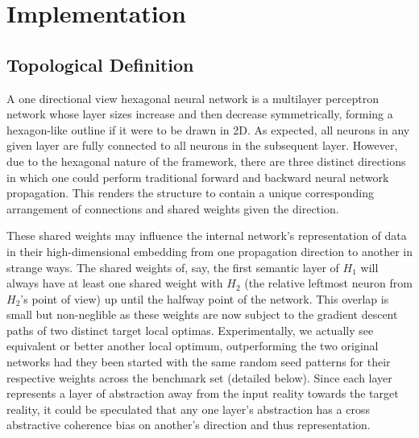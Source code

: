 \section{Implementation}


\subsection{Topological Definition}
A one directional view hexagonal neural network is a multilayer perceptron network whose layer sizes increase and then decrease symmetrically, forming a hexagon-like outline if it were to be drawn in 2D.
As expected, all neurons in any given layer are fully connected to all neurons in the subsequent layer.
However, due to the hexagonal nature of the framework, there are three distinct directions in which one could perform traditional forward and backward neural network propagation.
This renders the structure to contain a unique corresponding arrangement of connections and shared weights given the direction.


These shared weights may influence the internal network's representation of data in their high-dimensional embedding from one propagation direction to another in strange ways.
The shared weights of, say, the first semantic layer of $H_1$ will always have at least one shared weight with $H_2$ (the relative leftmost neuron from $H_2$'s point of view) up until the halfway point of the network.
This overlap is small but non-neglible as these weights are now subject to the gradient descent paths of two distinct target local optimas.
Experimentally, we actually see equivalent or better another local optimum, outperforming the two original networks had they been started with the same random seed patterns for their respective weights across the benchmark set (detailed below).
Since each layer represents a layer of abstraction away from the input reality towards the target reality, it could be speculated that any one layer's abstraction has a cross abstractive coherence bias on another's direction and thus representation.

